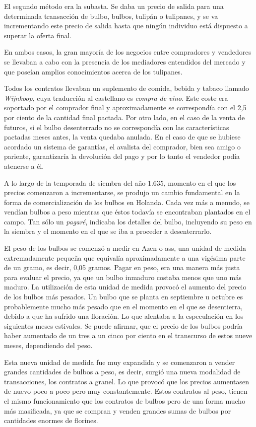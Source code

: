 El segundo método era la subasta. Se daba un precio de salida para una determinada transacción de bulbo, bulbos, tulipán o tulipanes, y se va incrementando este precio de salida hasta que ningún individuo está dispuesto a superar la oferta final.

En ambos casos, la gran mayoría de los negocios entre compradores y vendedores se llevaban a cabo con la presencia de los mediadores entendidos del mercado y que poseían amplios conocimientos acerca de los tulipanes.

Todos los contratos llevaban un suplemento de comida, bebida y tabaco llamado  \emph{Wijnkoop}, cuya traducción al castellano es  \emph{compra de vino}. Este coste era soportado por el comprador final y aproximadamente se correspondía con el 2,5 por ciento de la cantidad final pactada. Por otro lado, en el caso de la venta de futuros, si el bulbo desenterrado no se correspondía con las características pactadas meses antes, la venta quedaba anulada. En el caso de que se hubiese acordado un sistema de garantías, el avalista del comprador, bien sea amigo o pariente, garantizaría la devolución del pago y por lo tanto el vendedor podía atenerse a él.

A lo largo de la temporada de siembra del año 1.635, momento en el que los precios comenzaron a incrementarse, se produjo un cambio fundamental en la forma de comercialización de los bulbos en Holanda. Cada vez más a menudo, se vendían bulbos a peso mientras que éstos todavía se encontraban plantados en el campo. Tan sólo un \emph{pagaré}, indicaba los detalles del bulbo, incluyendo su peso en la siembra y el momento en el que se iba a proceder a desenterrarlo.

El peso de los bulbos se comenzó a medir en Azen o ass, una unidad de medida extremadamente pequeña que equivalía aproximadamente a una vigésima parte de un gramo, es decir, 0,05 gramos. Pagar en peso, era una manera más justa para evaluar el precio, ya que un bulbo inmaduro costaba menos que uno más maduro. La utilización de esta unidad de medida provocó el aumento del precio de los bulbos más pesados. Un bulbo que se planta en septiembre u octubre es probablemente mucho más pesado que en el momento en el que se desentierra, debido a que ha sufrido una floración. Lo que alentaba a la especulación en los siguientes meses estivales. Se puede afirmar, que el precio de los bulbos podría haber aumentado de un tres a un cinco por ciento en el transcurso de estos nueve meses, dependiendo del peso.

Esta nueva unidad de medida fue muy expandida y se comenzaron a vender grandes cantidades de bulbos a peso, es decir, surgió una nueva modalidad de transacciones, los contratos a granel. Lo que provocó que los precios aumentasen de nuevo poco a poco pero muy constantemente. Estos contratos al peso, tienen el mismo funcionamiento que los contratos de bulbos pero de una forma mucho más masificada, ya que se compran y venden grandes sumas de bulbos por cantidades enormes de florines.

